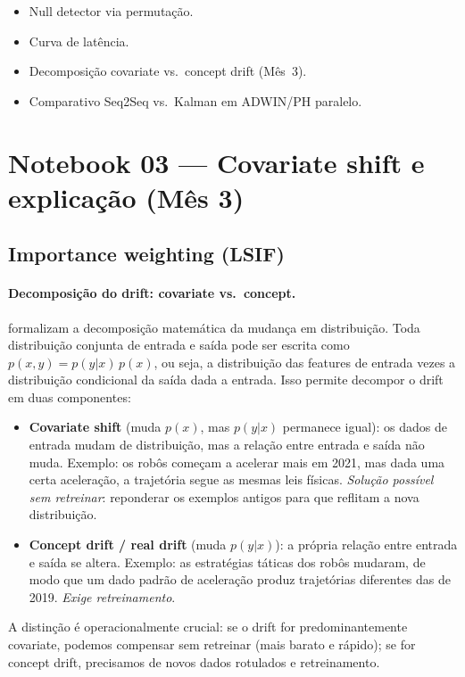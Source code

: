 \documentclass[11pt,a4paper]{article}
\begin{document}
\begin{itemize}[leftmargin=1.4em,itemsep=2pt]
    \item Null detector via permuta\c{c}\~ao.
    \item Curva de lat\^encia.
    \item Decomposi\c{c}\~ao covariate vs.\ concept drift (M\^es~3).
    \item Comparativo Seq2Seq vs.\ Kalman em ADWIN/PH paralelo.
\end{itemize}

\section{Notebook 03 --- Covariate shift e explica\c{c}\~ao (M\^es 3)}
\label{sec:iw}

\subsection{Importance weighting (LSIF)}

\paragraph{Decomposi\c{c}\~ao do drift: covariate vs.\ concept.}
\citet{gama2014} formalizam a decomposi\c{c}\~ao matem\'atica da mudan\c{c}a em distribui\c{c}\~ao. Toda distribui\c{c}\~ao conjunta de entrada e sa\'ida pode ser escrita como $p(x,y) = p(y|x)\,p(x)$, ou seja, a distribui\c{c}\~ao das features de entrada vezes a distribui\c{c}\~ao condicional da sa\'ida dada a entrada. Isso permite decompor o drift em duas componentes:
\begin{itemize}[leftmargin=1.4em,itemsep=1pt]
    \item \textbf{Covariate shift} (muda $p(x)$, mas $p(y|x)$ permanece igual): os dados de entrada mudam de distribui\c{c}\~ao, mas a rela\c{c}\~ao entre entrada e sa\'ida n\~ao muda. Exemplo: os rob\^os come\c{c}am a acelerar mais em 2021, mas dada uma certa acelera\c{c}\~ao, a trajet\'oria segue as mesmas leis f\'isicas. \emph{Sol\-u\-\c{c}\~ao poss\'ivel sem retreinar}: reponderar os exemplos antigos para que reflitam a nova distribui\c{c}\~ao.
    \item \textbf{Concept drift / real drift} (muda $p(y|x)$): a pr\'opria rela\c{c}\~ao entre entrada e sa\'ida se altera. Exemplo: as estrat\'egias t\'aticas dos rob\^os mudaram, de modo que um dado padr\~ao de acelera\c{c}\~ao produz trajet\'orias diferentes das de 2019. \emph{Exige retreinamento}.
\end{itemize}
A distin\c{c}\~ao \'e operacionalmente crucial: se o drift for predominantemente covariate, podemos compensar sem retreinar (mais barato e r\'apido); se for concept drift, precisamos de novos dados rotulados e retreinamento.
\end{document}
